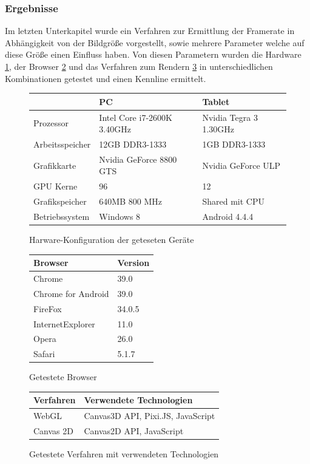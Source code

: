 \subsubsection{Ergebnisse}
Im letzten Unterkapitel wurde ein Verfahren zur Ermittlung der Framerate in Abhängigkeit von der Bildgröße vorgestellt, 
sowie mehrere Parameter welche auf diese Größe einen Einfluss haben.
Von diesen Parametern wurden die Hardware \ref{tab:tested_hardware}, 
der Browser \ref{tab:tested_browser} und das Verfahren zum Rendern \ref{tab:tested_technologies} in unterschiedlichen Kombinationen getestet und einen Kennline ermittelt.
\begin{figure}[t]
	\centering
	\begin{tabular}{| l | l | l |}
		\hline
				& PC				& Tablet \\
		\hline
		Prozessor	& Intel Core i7-2600K 3.40GHz	& Nvidia Tegra 3 1.30GHz \\
		Arbeitsspeicher	& 12GB DDR3-1333		& 1GB DDR3-1333 \\
		Grafikkarte	& Nvidia GeForce 8800 GTS	& Nvidia GeForce ULP \\
		GPU Kerne	& 96				& 12 \\
		Grafikspeicher	& 640MB 800 MHz			& Shared mit CPU \\
		Betriebssystem	& Windows 8			& Android 4.4.4 \\
		\hline
	\end{tabular}
	\caption{Harware-Konfiguration der geteseten Geräte}
	\label{tab:tested_hardware}
\end{figure}
\begin{figure}[t]
	\centering
	\begin{tabular}{| l | l |}
		\hline
		Browser			& Version \\
		\hline
		Chrome			& 39.0 \\
		Chrome for Android 	& 39.0 \\
		FireFox			& 34.0.5 \\
		InternetExplorer	& 11.0 \\
		Opera			& 26.0 \\
		Safari			& 5.1.7 \\
		\hline
	\end{tabular}
	\caption{Getestete Browser}
	\label{tab:tested_browser}
\end{figure}
\begin{figure}[t]
	\centering
	\begin{tabular}{| l | l |}
		\hline
		Verfahren	& Verwendete Technologien \\
		\hline
		WebGL		& Canvas3D API, Pixi.JS, JavaScript \\
		Canvas 2D	& Canvas2D API, JavaScript \\
		\hline
	\end{tabular}
	\caption{Getestete Verfahren mit verwendeten Technologien}
	\label{tab:tested_technologies}
\end{figure}


